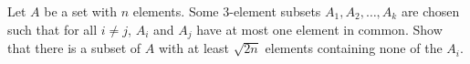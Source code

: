 Let $A$ be a set with $n$ elements. Some $3$-element subsets $A_1, A_2, \ldots, A_k$ are chosen such that for all $i \neq j$, $A_i$ and $A_j$ have at most one element in common. Show that there is a subset of $A$ with at least $\sqrt{2n}$ elements containing none of the $A_i$.
